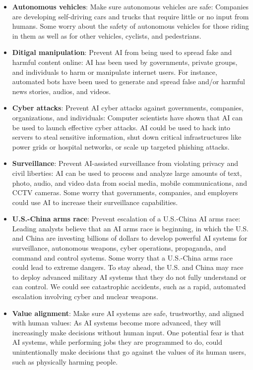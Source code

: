 \documentclass{article}
\begin{document}
\begin{itemize}
\item \textbf{Autonomous vehicles}: Make sure autonomous vehicles are safe: Companies are developing self-driving cars and trucks that require little or no input from humans. Some worry about the safety of autonomous vehicles for those riding in them as well as for other vehicles, cyclists, and pedestrians.
\item \textbf{Ditigal manipulation}: Prevent AI from being used to spread fake and harmful content online: AI has been used by governments, private groups, and individuals to harm or manipulate internet users. For instance, automated bots have been used to generate and spread false and/or harmful news stories, audios, and videos.
\item \textbf{Cyber attacks}: Prevent AI cyber attacks against governments, companies, organizations, and individuals: Computer scientists have shown that AI can be used to launch effective cyber attacks. AI could be used to hack into servers to steal sensitive information, shut down critical infrastructures like power grids or hospital networks, or scale up targeted phishing attacks.
\item \textbf{Surveillance}: Prevent AI-assisted surveillance from violating privacy and civil liberties: AI can be used to process and analyze large amounts of text, photo, audio, and video data from social media, mobile communications, and CCTV cameras. Some worry that governments, companies, and employers could use AI to increase their surveillance capabilities.
\item \textbf{U.S.-China arms race}: Prevent escalation of a U.S.-China AI arms race: Leading analysts believe that an AI arms race is beginning, in which the U.S. and China are investing billions of dollars to develop powerful AI systems for surveillance, autonomous weapons, cyber operations, propaganda, and command and control systems. Some worry that a U.S.-China arms race could lead to extreme dangers. To stay ahead, the U.S. and China may race to deploy advanced military AI systems that they do not fully understand or can control. We could see catastrophic accidents, such as a rapid, automated escalation involving cyber and nuclear weapons.
\item \textbf{Value alignment}: Make sure AI systems are safe, trustworthy, and aligned with human values: As AI systems become more advanced, they will increasingly make decisions without human input. One potential fear is that AI systems, while performing jobs they are programmed to do, could unintentionally make decisions that go against the values of its human users, such as physically harming people.

\end{itemize}
\end{document}
